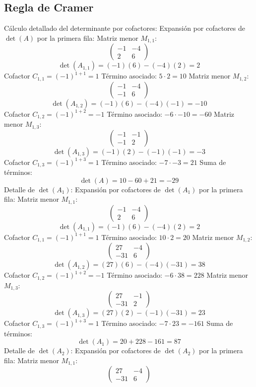 \documentclass{article}
\begin{document}
\subsection*{Regla de Cramer}
Cálculo detallado del determinante por cofactores:
Expansión por cofactores de $\det(A)$ por la primera fila:
Matriz menor $M_{1,1}$:
\[\begin{pmatrix}-1 & -4 \\ 2 & 6\end{pmatrix}\]
\[\det(A_{1,1}) = (-1)(6) - (-4)(2) = 2\]
Cofactor $C_{1,1} = (-1)^{1+1} = 1$
Término asociado: $ 5 \cdot 2 = 10 $
Matriz menor $M_{1,2}$:
\[\begin{pmatrix}-1 & -4 \\ -1 & 6\end{pmatrix}\]
\[\det(A_{1,2}) = (-1)(6) - (-4)(-1) = -10\]
Cofactor $C_{1,2} = (-1)^{1+2} = -1$
Término asociado: $ -6 \cdot -10 = -60 $
Matriz menor $M_{1,3}$:
\[\begin{pmatrix}-1 & -1 \\ -1 & 2\end{pmatrix}\]
\[\det(A_{1,3}) = (-1)(2) - (-1)(-1) = -3\]
Cofactor $C_{1,3} = (-1)^{1+3} = 1$
Término asociado: $ -7 \cdot -3 = 21 $
Suma de términos:
\[\det(A) = 10 - 60 + 21 = -29\]
Detalle de $\det(A_{1})$:
Expansión por cofactores de $\det(A_{1})$ por la primera fila:
Matriz menor $M_{1,1}$:
\[\begin{pmatrix}-1 & -4 \\ 2 & 6\end{pmatrix}\]
\[\det(A_{1,1}) = (-1)(6) - (-4)(2) = 2\]
Cofactor $C_{1,1} = (-1)^{1+1} = 1$
Término asociado: $ 10 \cdot 2 = 20 $
Matriz menor $M_{1,2}$:
\[\begin{pmatrix}27 & -4 \\ -31 & 6\end{pmatrix}\]
\[\det(A_{1,2}) = (27)(6) - (-4)(-31) = 38\]
Cofactor $C_{1,2} = (-1)^{1+2} = -1$
Término asociado: $ -6 \cdot 38 = 228 $
Matriz menor $M_{1,3}$:
\[\begin{pmatrix}27 & -1 \\ -31 & 2\end{pmatrix}\]
\[\det(A_{1,3}) = (27)(2) - (-1)(-31) = 23\]
Cofactor $C_{1,3} = (-1)^{1+3} = 1$
Término asociado: $ -7 \cdot 23 = -161 $
Suma de términos:
\[\det(A_{1}) = 20 + 228 - 161 = 87\]
Detalle de $\det(A_{2})$:
Expansión por cofactores de $\det(A_{2})$ por la primera fila:
Matriz menor $M_{1,1}$:
\[\begin{pmatrix}27 & -4 \\ -31 & 6\end{pmatrix}\]
\end{document}
